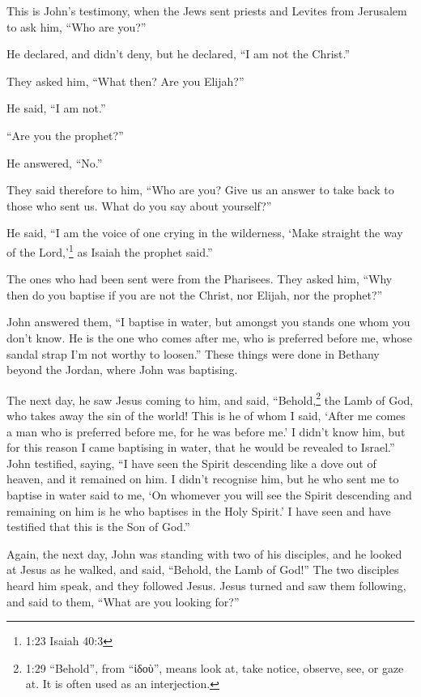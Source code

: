  This is John's testimony, when the Jews sent priests and
Levites from Jerusalem to ask him, ``Who are you?''

 He declared, and didn't deny, but he declared, ``I am not
the Christ.''

 They asked him, ``What then? Are you Elijah?''

He said, ``I am not.''

``Are you the prophet?''

He answered, ``No.''

 They said therefore to him, ``Who are you? Give us an
answer to take back to those who sent us. What do you say about
yourself?''

 He said, ``I am the voice of one crying in the wilderness,
`Make straight the way of the Lord,'\footnote{1:23 Isaiah 40:3} as
Isaiah the prophet said.''

 The ones who had been sent were from the Pharisees.
 They asked him, ``Why then do you baptise if you are not
the Christ, nor Elijah, nor the prophet?''

 John answered them, ``I baptise in water, but amongst you
stands one whom you don't know.  He is the one who comes
after me, who is preferred before me, whose sandal strap I'm not worthy
to loosen.''  These things were done in Bethany beyond the
Jordan, where John was baptising.

 The next day, he saw Jesus coming to him, and said,
``Behold,\footnote{1:29 ``Behold'', from ``ἰδοὺ'', means look at, take
  notice, observe, see, or gaze at. It is often used as an interjection.}
the Lamb of God, who takes away the sin of the world!  This
is he of whom I said, `After me comes a man who is preferred before me,
for he was before me.'  I didn't know him, but for this
reason I came baptising in water, that he would be revealed to Israel.''
 John testified, saying, ``I have seen the Spirit
descending like a dove out of heaven, and it remained on him.
 I didn't recognise him, but he who sent me to baptise in
water said to me, `On whomever you will see the Spirit descending and
remaining on him is he who baptises in the Holy Spirit.'  I
have seen and have testified that this is the Son of God.''

 Again, the next day, John was standing with two of his
disciples,  and he looked at Jesus as he walked, and said,
``Behold, the Lamb of God!''  The two disciples heard him
speak, and they followed Jesus.  Jesus turned and saw them
following, and said to them, ``What are you looking for?''

